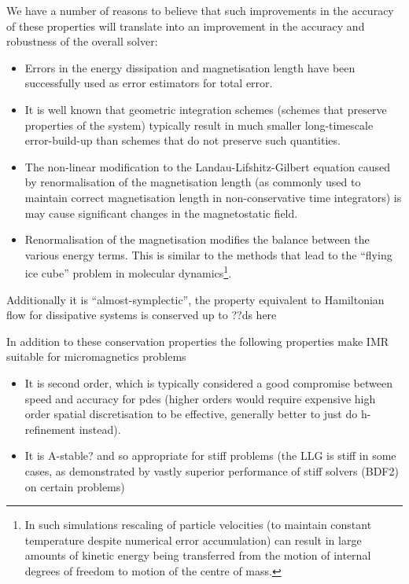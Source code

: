 We have a number of reasons to believe that such improvements in the accuracy of these properties will translate into an improvement in the accuracy and robustness of the overall solver:
\begin{itemize}
\item Errors in the energy dissipation\cite{Albuquerque2001} and magnetisation length\cite{Chantrell2001} have been successfully used as error estimators for total error.

\item It is well known that geometric integration schemes (\ie schemes that preserve properties of the system) typically result in much smaller long-timescale error-build-up than schemes that do not preserve such quantities.\cite[pg. 77]{Iserles2009}

\item The non-linear modification to the Landau-Lifshitz-Gilbert equation caused by renormalisation of the magnetisation length (as commonly used to maintain correct magnetisation length in non-conservative time integrators) is may cause significant changes in the magnetostatic field.\cite{Lewis2003}

\item Renormalisation of the magnetisation modifies the balance between the various energy terms.
  This is similar to the methods that lead to the ``flying ice cube'' problem in molecular dynamics\footnote{In such simulations rescaling of particle velocities (to maintain constant temperature despite numerical error accumulation) can result in large amounts of kinetic energy being transferred from the motion of internal degrees of freedom to motion of the centre of mass.}.\cite{Harvey1998}
\end{itemize}

Additionally it is ``almost-symplectic'', \ie the property equivalent to Hamiltonian flow for  dissipative systems is conserved up to \cite{daquino2005}\cite{??ds-older-paper for this?} ??ds here

In addition to these conservation properties the following properties make IMR suitable for micromagnetics problems
\begin{itemize}
\item It is second order, which is typically considered a good compromise between speed and accuracy for pdes (higher orders would require expensive high order spatial discretisation to be effective, generally better to just do h-refinement instead).\cite{Matthias}
\item It is A-stable? \cite{??ds} and so appropriate for stiff problems (the LLG is stiff in some cases, as demonstrated by vastly superior performance of stiff solvers (\eg BDF2) on certain problems\cite{Tsiantos2001})
\end{itemize}

